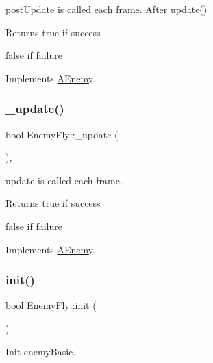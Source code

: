 post\+Update is called each frame. After \hyperlink{class_a_enemy_a01e3b0313d6f29bf2cafe20f711c0550}{update()} 

\begin{DoxyReturn}{Returns}
true if success 

false if failure 
\end{DoxyReturn}


Implements \hyperlink{class_a_enemy_a78b010638f552c4ab11ff71e7b826b1b}{A\+Enemy}.

\mbox{\label{class_enemy_fly_a9b5577a848bba5d11e1d90cf923973ad}} 
\subsubsection{\texorpdfstring{\+\_\+update()}{\_update()}}
{\footnotesize\ttfamily bool Enemy\+Fly\+::\+\_\+update (\begin{DoxyParamCaption}{ }\end{DoxyParamCaption})\hspace{0.3cm}{\ttfamily [protected]}, {\ttfamily [virtual]}}



update is called each frame. 

\begin{DoxyReturn}{Returns}
true if success 

false if failure 
\end{DoxyReturn}


Implements \hyperlink{class_a_enemy_abefc22131eb1c618819c67c3c1415c08}{A\+Enemy}.

\mbox{\label{class_enemy_fly_a8957442e19b91b06bf1f3bb650d66a8c}} 
\subsubsection{\texorpdfstring{init()}{init()}}
{\footnotesize\ttfamily bool Enemy\+Fly\+::init (\begin{DoxyParamCaption}{ }\end{DoxyParamCaption})\hspace{0.3cm}{\ttfamily [virtual]}}



Init enemy\+Basic. 

